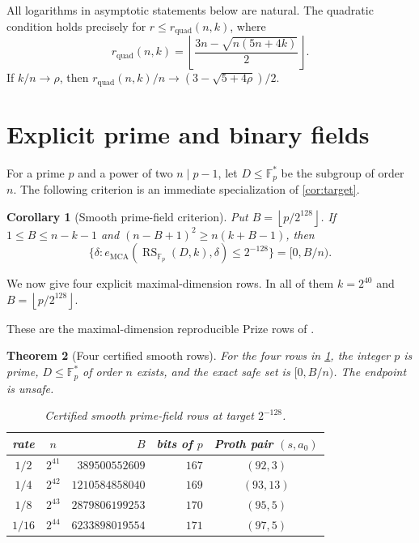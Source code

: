 \documentclass[11pt,a4paper]{amsart}
\numberwithin{equation}{section}
\newtheorem{theorem}{Theorem}[section]
\newtheorem{corollary}[theorem]{Corollary}
\theoremstyle{remark}
\DeclareMathOperator{\RS}{RS}
\DeclareMathOperator{\MCA}{MCA}
\newcommand{\F}{\mathbb F}
\newcommand{\floor}[1]{\left\lfloor#1\right\rfloor}
\begin{document}
All logarithms in asymptotic statements below are natural.  The quadratic condition holds precisely for $r\le r_{\mathrm{quad}}(n,k)$, where
\[
 r_{\mathrm{quad}}(n,k)=\floor{\frac{3n-\sqrt{n(5n+4k)}}2}.
\]
If $k/n\to\rho$, then $r_{\mathrm{quad}}(n,k)/n\to(3-\sqrt{5+4\rho})/2$.

\section{Explicit prime and binary fields}

For a prime $p$ and a power of two $n\mid p-1$, let $D\le\F_p^*$ be the subgroup of order $n$.  The following criterion is an immediate specialization of \cref{cor:target}.

\begin{corollary}[Smooth prime-field criterion]\label{cor:prime-criterion}
Put $B=\floor{p/2^{128}}$.  If $1\le B\le n-k-1$ and $(n-B+1)^2\ge n(k+B-1)$, then
\[
 \{\delta:e_{\MCA}(\RS_{\F_p}(D,k),\delta)\le2^{-128}\}=[0,B/n).
\]
\end{corollary}

We now give four explicit maximal-dimension rows.  In all of them $k=2^{40}$ and $B=\floor{p/2^{128}}$.

These are the maximal-dimension reproducible Prize rows of \cite[Section ``Reproducible finite Prize instances'']{ChoShort26}.

\begin{theorem}[Four certified smooth rows]\label{thm:prime-rows}
For the four rows in \cref{tab:prime-rows}, the integer $p$ is prime, $D\le\F_p^*$ of order $n$ exists, and the exact safe set is $[0,B/n)$.  The endpoint is unsafe.

\begin{table}[ht]
\centering
\caption{Certified smooth prime-field rows at target $2^{-128}$.}
\label{tab:prime-rows}
\begin{tabular}{@{}ccrrc@{}}
\toprule
rate & $n$ & $B$ & bits of $p$ & Proth pair $(s,a_0)$\\
\midrule
$1/2$  & $2^{41}$ & $389500552609$  & $167$ & $(92,3)$\\
$1/4$  & $2^{42}$ & $1210584858040$ & $169$ & $(93,13)$\\
$1/8$  & $2^{43}$ & $2879806199253$ & $170$ & $(95,5)$\\
$1/16$ & $2^{44}$ & $6233898019554$ & $171$ & $(97,5)$\\
\bottomrule
\end{tabular}
\end{table}
\end{theorem}
\end{document}
